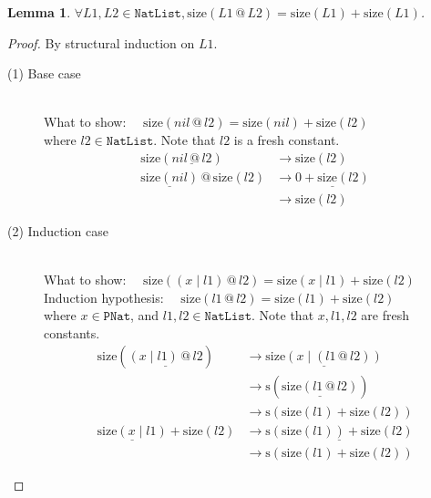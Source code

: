 \documentclass[12pt, a4paper]{article}
\newtheorem{lemma}[theorem]{Lemma}
\newcommand{\rel}[1]{\mathrel{#1}}
\newcommand{\rmx}[1]{\mathrm{#1}}
\newcommand{\larrow}{\longrightarrow}
\newcommand{\under}{\underline}
\begin{document}
\begin{lemma}
\label{lm1}
$\forall L1, L2 \in \mathtt{NatList}, \rmx{size}(L1 \rel{@} L2) = \rmx{size}(L1) \rel{+} \rmx{size}(L1)$.
\end{lemma}
\begin{proof}
By structural induction on $L1$.

\begin{description}

\item[(1) Base case]~\\
\noindent
What to show: $\quad \rmx{size}(nil \rel{@} l2) = \rmx{size}(nil) \rel{+} \rmx{size}(l2)$ \\
where $l2 \in \mathtt{NatList}$. Note that $l2$ is a fresh constant.
\begin{align*}
\rmx{size}(\under{nil \rel{@} l2})
	&\larrow \rmx{size}(l2) \tag{by @1} \\
\under{\rmx{size}(nil)} \rel{@} \rmx{size}(l2)
	&\larrow \under{0 \rel{+} \rmx{size}(l2)} \tag{by size1} \\
	&\larrow \rmx{size}(l2) \tag{by +1}
\end{align*}

\item[(2) Induction case]~\\
What to show: $\quad \rmx{size}((x \rel{|} l1) \rel{@} l2) = \rmx{size}(x \rel{|} l1) \rel{+} \rmx{size}(l2)$ \\
Induction hypothesis: $\quad \rmx{size}(l1 \rel{@} l2) = \rmx{size}(l1) \rel{+} \rmx{size}(l2)$  \\
where $x \in \mathtt{PNat}$, and $l1, l2 \in \mathtt{NatList}$. Note that $x, l1, l2$ are fresh constants.
\begin{align*}
\rmx{size}(\under{(x \rel{|} l1) \rel{@} l2})
	&\larrow \under{\rmx{size}(x \rel{|} (l1 \rel{@} l2))} \tag{by @2} \\
	&\larrow \rmx{s}(\under{\rmx{size}(l1 \rel{@} l2)}) \tag{by size2} \\
	&\larrow \rmx{s}(\rmx{size}(l1) \rel{+} \rmx{size}(l2)) \tag{by IH} \\
\under{\rmx{size}(x \rel{|} l1)} \rel{+} \rmx{size}(l2)
	&\larrow \under{\rmx{s}(\rmx{size}(l1)) \rel{+} \rmx{size}(l2)} \tag{by size2} \\
	&\larrow \rmx{s}(\rmx{size}(l1) \rel{+} \rmx{size}(l2)) \tag{by +2}
\end{align*}

\end{description}
\end{proof}
\end{document}
